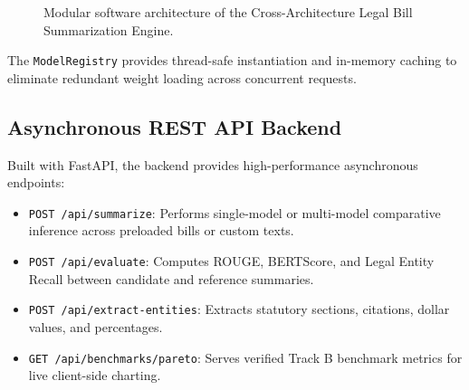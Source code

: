 \documentclass[conference]{IEEEtran}
\begin{document}
\begin{figure}[htbp]
\begin{center}
\caption{Modular software architecture of the Cross-Architecture Legal Bill Summarization Engine.}
\label{fig:arch_diag}
\end{center}
\end{figure}

The \texttt{ModelRegistry} provides thread-safe instantiation and in-memory caching to eliminate redundant weight loading across concurrent requests.

\subsection{Asynchronous REST API Backend}
Built with FastAPI, the backend provides high-performance asynchronous endpoints:
\begin{itemize}
    \item \texttt{POST /api/summarize}: Performs single-model or multi-model comparative inference across preloaded bills or custom texts.
    \item \texttt{POST /api/evaluate}: Computes ROUGE, BERTScore, and Legal Entity Recall between candidate and reference summaries.
    \item \texttt{POST /api/extract-entities}: Extracts statutory sections, citations, dollar values, and percentages.
    \item \texttt{GET /api/benchmarks/pareto}: Serves verified Track B benchmark metrics for live client-side charting.
\end{itemize}
\end{document}
